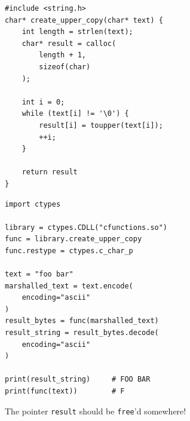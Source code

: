 \begin{frame}[fragile]
%
\begin{tcbraster}[raster columns=2,
                  raster equal height,
                  nobeforeafter,
                  raster column skip=0.2cm]
\begin{codebox}
\begin{verbatim}
#include <string.h>
char* create_upper_copy(char* text) {
    int length = strlen(text);
    char* result = calloc(
        length + 1,
        sizeof(char)
    );
    
    int i = 0;
    while (text[i] != '\0') {
        result[i] = toupper(text[i]);
        ++i;
    }
    
    return result
}
\end{verbatim}
\end{codebox}
%
\begin{codebox}
\begin{verbatim}
import ctypes

library = ctypes.CDLL("cfunctions.so")
func = library.create_upper_copy
func.restype = ctypes.c_char_p

text = "foo bar"
marshalled_text = text.encode(
    encoding="ascii"
)
result_bytes = func(marshalled_text)
result_string = result_bytes.decode(
    encoding="ascii"
)

print(result_string)     # FOO BAR
print(func(text))        # F
\end{verbatim}
\end{codebox}
\end{tcbraster}
%
\begin{warnbox}[]
\footnotesize
The pointer \texttt{result} should be \texttt{free}'d somewhere!
\end{warnbox}
%
\end{frame}


